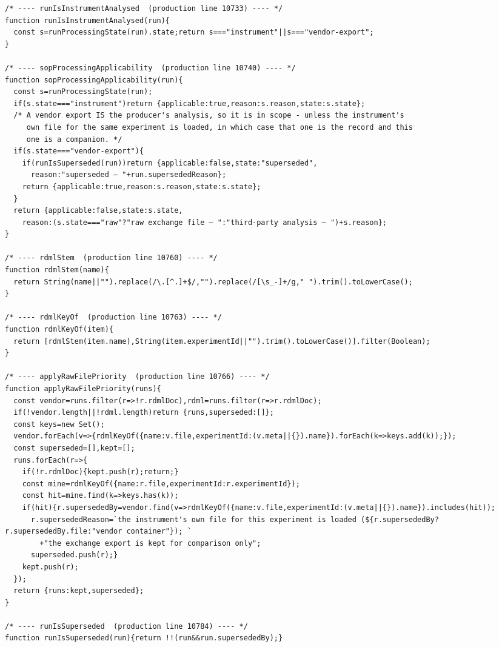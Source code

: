 \begin{multicols}{2}
\begin{lstlisting}[style=jstiny]
/* ---- runIsInstrumentAnalysed  (production line 10733) ---- */
function runIsInstrumentAnalysed(run){
  const s=runProcessingState(run).state;return s==="instrument"||s==="vendor-export";
}

/* ---- sopProcessingApplicability  (production line 10740) ---- */
function sopProcessingApplicability(run){
  const s=runProcessingState(run);
  if(s.state==="instrument")return {applicable:true,reason:s.reason,state:s.state};
  /* A vendor export IS the producer's analysis, so it is in scope - unless the instrument's
     own file for the same experiment is loaded, in which case that one is the record and this
     one is a companion. */
  if(s.state==="vendor-export"){
    if(runIsSuperseded(run))return {applicable:false,state:"superseded",
      reason:"superseded — "+run.supersededReason};
    return {applicable:true,reason:s.reason,state:s.state};
  }
  return {applicable:false,state:s.state,
    reason:(s.state==="raw"?"raw exchange file — ":"third-party analysis — ")+s.reason};
}

/* ---- rdmlStem  (production line 10760) ---- */
function rdmlStem(name){
  return String(name||"").replace(/\.[^.]+$/,"").replace(/[\s_-]+/g," ").trim().toLowerCase();
}

/* ---- rdmlKeyOf  (production line 10763) ---- */
function rdmlKeyOf(item){
  return [rdmlStem(item.name),String(item.experimentId||"").trim().toLowerCase()].filter(Boolean);
}

/* ---- applyRawFilePriority  (production line 10766) ---- */
function applyRawFilePriority(runs){
  const vendor=runs.filter(r=>!r.rdmlDoc),rdml=runs.filter(r=>r.rdmlDoc);
  if(!vendor.length||!rdml.length)return {runs,superseded:[]};
  const keys=new Set();
  vendor.forEach(v=>{rdmlKeyOf({name:v.file,experimentId:(v.meta||{}).name}).forEach(k=>keys.add(k));});
  const superseded=[],kept=[];
  runs.forEach(r=>{
    if(!r.rdmlDoc){kept.push(r);return;}
    const mine=rdmlKeyOf({name:r.file,experimentId:r.experimentId});
    const hit=mine.find(k=>keys.has(k));
    if(hit){r.supersededBy=vendor.find(v=>rdmlKeyOf({name:v.file,experimentId:(v.meta||{}).name}).includes(hit));
      r.supersededReason=`the instrument's own file for this experiment is loaded (${r.supersededBy?r.supersededBy.file:"vendor container"}); `
        +"the exchange export is kept for comparison only";
      superseded.push(r);}
    kept.push(r);
  });
  return {runs:kept,superseded};
}

/* ---- runIsSuperseded  (production line 10784) ---- */
function runIsSuperseded(run){return !!(run&&run.supersededBy);}

\end{lstlisting}

\end{multicols}
\AThreeEnd
